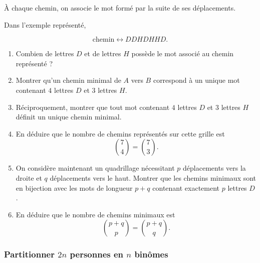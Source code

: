 \begin{center}
\end{center}

À chaque chemin, on associe le mot formé par la suite de ses déplacements.

Dans l'exemple représenté,

\[
\text{chemin}
\longleftrightarrow
DDHDHHD.
\]

\begin{enumerate}
    \item Combien de lettres \(D\) et de lettres \(H\) possède le mot associé
    au chemin représenté ?

    \item Montrer qu'un chemin minimal de \(A\) vers \(B\) correspond à un
    unique mot contenant \(4\) lettres \(D\) et \(3\) lettres \(H\).

    \item Réciproquement, montrer que tout mot contenant \(4\) lettres \(D\)
    et \(3\) lettres \(H\) définit un unique chemin minimal.

    \item En déduire que le nombre de chemins représentés sur cette grille est
    \[
    \binom{7}{4}
    =
    \binom{7}{3}.
    \]

    \item On considère maintenant un quadrillage nécessitant \(p\) déplacements
    vers la droite et \(q\) déplacements vers le haut. Montrer que les chemins
    minimaux sont en bijection avec les mots de longueur \(p+q\) contenant
    exactement \(p\) lettres \(D\).

    \item En déduire que le nombre de chemins minimaux est
    \[
    \boxed{
    \binom{p+q}{p}
    =
    \binom{p+q}{q}.
    }
    \]
\end{enumerate}

\subsubsection{Partitionner \(2n\) personnes en \(n\) binômes}

